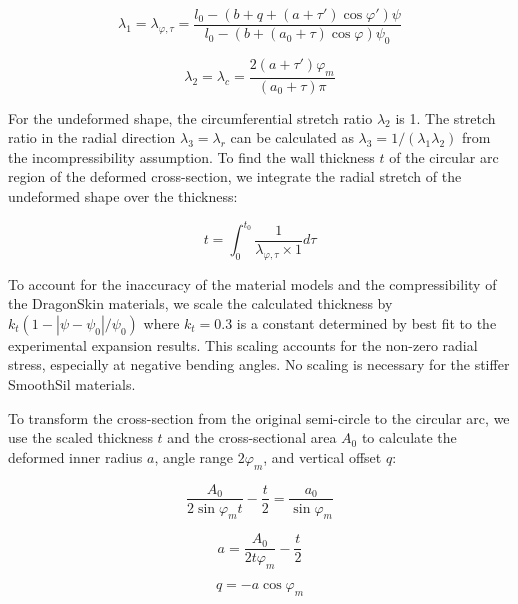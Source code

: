 \begin{equation}
    \lambda_1=\lambda_{\varphi,\tau} = \frac{l_{0} - (b+q+(a+\tau')\cos\varphi')\psi}{l_{0} - (b+(a_0+\tau)\cos\varphi)\psi_{0}}
    \label{eq:stretchphitau}
\end{equation}

\begin{equation}
    \lambda_2=\lambda_c = \frac{2(a+\tau')\varphi_m}{(a_0+\tau)\pi} 
    \label{eq:stretchc}
\end{equation}

For the undeformed shape, the circumferential stretch ratio $\lambda_2$ is 1. The stretch ratio in the radial direction $\lambda_3=\lambda_r$ can be calculated as $\lambda_3=1/(\lambda_1 \lambda_2)$ from the incompressibility assumption. To find the wall thickness $t$ of the circular arc region of the deformed cross-section, we integrate the radial stretch of the undeformed shape over the thickness:

\begin{equation}
    t = \int_0^{t_0} \frac{1}{\lambda_{\varphi,\tau} \times 1} d\tau 
    \label{eq:thicknessfromlambdar}
\end{equation}

To account for the inaccuracy of the material models and the compressibility of the DragonSkin materials, we scale the calculated thickness by $k_t(1-|\psi-\psi_0|/\psi_0)$ where $k_t = 0.3$ is a constant determined by best fit to the experimental expansion results. This scaling accounts for the non-zero radial stress, especially at negative bending angles. No scaling is necessary for the stiffer SmoothSil materials. 

To transform the cross-section from the original semi-circle to the circular arc, we use the scaled thickness $t$ and the cross-sectional area $A_0$ to calculate the deformed inner radius $a$, angle range $2\varphi_m$, and vertical offset $q$:

\begin{equation}
    \frac{A_0}{2\sin{\varphi_m}t}-\frac{t}{2}=\frac{a_0}{\sin{\varphi_m}}
    \label{eq:phi_m}
\end{equation}

\begin{equation}
    a=\frac{A_0}{2t\varphi_m}-\frac{t}{2}
    \label{eq:a_aug}
\end{equation}

\begin{equation}
    q=-a\cos{\varphi_m}
    \label{eq:q_aug}
\end{equation}

